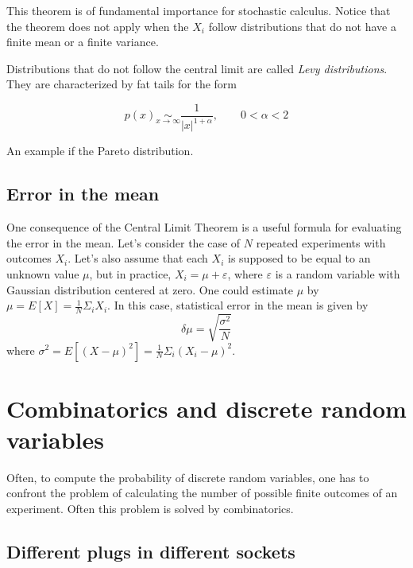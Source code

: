 \documentclass[justified,sixbynine]{tufte-book}
\def\stackunder#1#2{\mathrel{\mathop{#2}\limits_{#1}}}
\theoremstyle{plain}%
\theoremstyle{definition}
\theoremstyle{remark}
\begin{document}
\begin{fullwidth}
This theorem is of fundamental importance for stochastic calculus. Notice that the theorem does not apply when the $X_i$ follow distributions that do not have a finite mean or a finite variance.


Distributions that do not follow the central limit are called {\it Levy distributions}.
They are characterized by fat tails for the form

\begin{equation}
p(x) \stackunder{x\rightarrow\infty}{\sim} \frac1{\left|x\right|^{1+\alpha}}, \qquad 0<\alpha<2
\end{equation}

An example if the Pareto distribution.

\goodbreak\subsection{Error in the mean}

One consequence of the Central Limit Theorem is a useful formula for evaluating the error in the mean.
Let's consider the case of $N$ repeated experiments with outcomes $X_i$.
Let's also assume that each $X_i$ is supposed to be equal to an unknown
value $\mu $, but in practice, $X_i=\mu +\varepsilon $, where $\varepsilon $ is
a random variable with Gaussian distribution centered at zero. One could
estimate $\mu $ by $\mu =E[X]=\frac 1N\Sigma _iX_i$.
In this case, statistical error in the mean is given by
\begin{equation}
\delta \mu =\sqrt{\frac{\sigma ^2}{N}}
\label{error}
\end{equation}
where $\sigma ^2=E[(X-\mu )^2]=\frac 1N\Sigma _i(X_i-\mu )^2$.



\goodbreak\section{Combinatorics and discrete random variables}

Often, to compute the probability of discrete random variables, one
has to confront the problem of calculating the number of possible finite
outcomes of an experiment. Often this problem is solved by combinatorics.

\goodbreak\subsection{Different plugs in different sockets}


\end{fullwidth}
\end{document}
